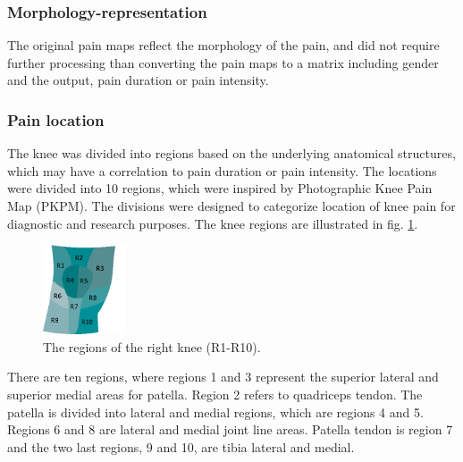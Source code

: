 \subsubsection{Morphology-representation}
The original pain maps reflect the morphology of the pain, and did not require further processing than converting the pain maps to a matrix including gender and the output, pain duration or pain intensity. 

\subsubsection{Pain location} 
The knee was divided into regions based on the underlying anatomical structures, which may have a correlation to pain duration or pain intensity.
The locations were divided into 10 regions, which were inspired by Photographic Knee Pain Map (PKPM). The divisions were designed to categorize location of knee pain for diagnostic and research purposes.\citep{Elson2010} The knee regions are illustrated in fig. \ref{fig:atlas}.

\begin{figure} [H] 
\centering
\includegraphics[width=0.22\textwidth]{Figures/atlas}
\caption{The regions of the right knee (R1-R10).}
\label{fig:atlas}
\end{figure}

\noindent 
There are ten regions, where regions 1 and 3 represent the superior lateral and superior medial areas for patella. Region 2 refers to quadriceps tendon. The patella is divided into lateral and medial regions, which are regions 4 and 5. Regions 6 and 8 are lateral and medial joint line areas. Patella tendon is region 7 and the two last regions, 9 and 10, are tibia lateral and medial.\citep{Elson2010}

